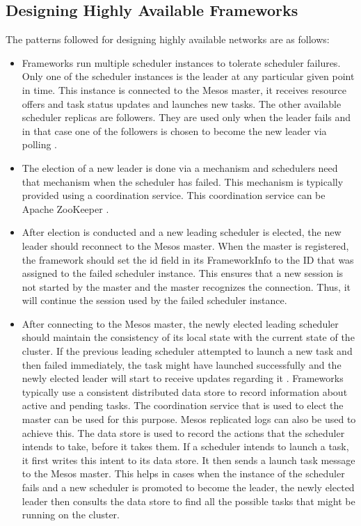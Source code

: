 \documentclass[9pt,twocolumn,twoside]{../../styles/osajnl}
\begin{document}
\subsection{Designing Highly Available Frameworks}
The patterns followed for designing highly available networks are as follows:
\begin{itemize}
\item Frameworks run multiple scheduler instances to tolerate
  scheduler failures. Only one of the scheduler instances is the
  leader at any particular given point in time. This instance is
  connected to the Mesos master, it receives resource offers and task
  status updates and launches new tasks. The other available
  scheduler replicas are followers. They are used only when the leader
  fails and in that case one of the followers is chosen to become the
  new leader via polling \cite{www-mesos-frmwrk}.
\item The election of a new leader is done via a mechanism and
  schedulers need that mechanism when the scheduler has failed. This
  mechanism is typically provided using a coordination service. This
  coordination service can be Apache ZooKeeper \cite{www-mesos-frmwrk}.
 \item After election is conducted and a new leading scheduler is
   elected, the new leader should reconnect to the Mesos master. When
   the master is registered, the framework should set the id field in
   its FrameworkInfo to the ID that was assigned to the failed
   scheduler instance. This ensures that a new session is not started
   by the master and the master recognizes the connection. Thus, it
   will continue the session used by the failed scheduler instance.
 \item After connecting to the Mesos master, the newly elected leading
   scheduler should maintain the consistency of its local state with
   the current state of the cluster. If the previous leading scheduler
   attempted to launch a new task and then failed immediately, the
   task might have launched successfully and the newly elected leader
   will start to receive updates regarding it
   \cite{www-mesos-frmwrk}. Frameworks typically use a consistent
   distributed data store to record information about active and
   pending tasks. The coordination service that is used to elect the
   master can be used for this purpose. Mesos replicated logs can also
   be used to achieve this. The data store is used to record the
   actions that the scheduler intends to take, before it takes
   them. If a scheduler intends to launch a task, it first writes this
   intent to its data store. It then sends a launch task message to
   the Mesos master. This helps in cases when the instance of the
   scheduler fails and a new scheduler is promoted to become the
   leader, the newly elected leader then consults the data store to
   find all the possible tasks that might be running on the cluster.


\end{itemize}
\end{document}
